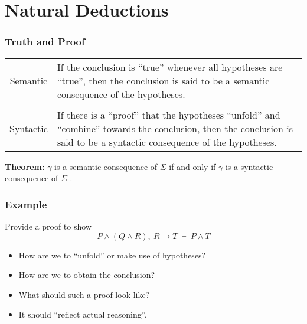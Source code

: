 \documentclass{beamer}
\begin{document}
\section{Natural Deductions}

\begin{frame}
	\frametitle{Truth and Proof}

	\begin{table}[h]
		\centering
		\begin{tabular}{c  p{}}
		Semantic & If the conclusion is ``true'' whenever all hypotheses are ``true'', then the conclusion is said to be a semantic consequence of the hypotheses. \\

		\vspace{0.2cm} & \\

		Syntactic & If there is a ``proof'' that the hypotheses ``unfold'' and ``combine'' towards the conclusion, then the conclusion is said to be a syntactic consequence of the hypotheses. 
		\end{tabular}
	\end{table}

	\vspace{0.5cm}

	{\bf Theorem:} $\gamma$ is a semantic consequence of $\Sigma$ if and only if $\gamma$ is a syntactic consequence of $\Sigma$ \cite{vDalen}. 	
\end{frame}

\begin{frame}
	\frametitle{Example}
	Provide a proof to show $$P \land (Q \land R), \ R \to T  \ \vdash \ P \land T$$

	\vspace{3cm}

	\begin{itemize}
		\item How are we to ``unfold'' or make use of hypotheses? 
		\item How are we to obtain the conclusion? 
		\item What should such a proof look like? 
		\item It should ``reflect actual reasoning''.
	\end{itemize}
\end{frame}
\end{document}
